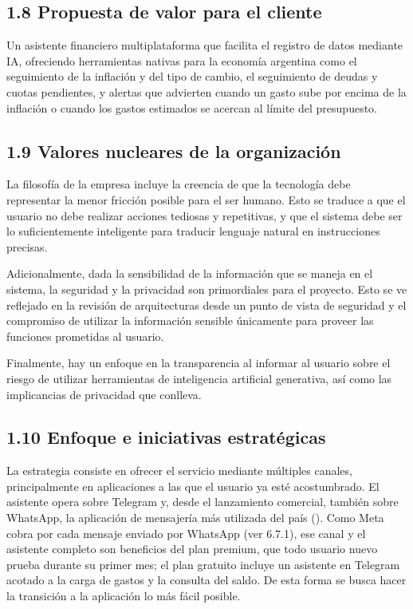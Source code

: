 \subsection*{1.8 Propuesta de valor para el
cliente}\label{propuesta-de-valor-para-el-cliente}

Un asistente financiero multiplataforma que facilita el registro de
datos mediante IA, ofreciendo herramientas nativas para la economía
argentina como el seguimiento de la inflación y del tipo de cambio, el
seguimiento de deudas y cuotas pendientes, y alertas que advierten
cuando un gasto sube por encima de la inflación o cuando los gastos
estimados se acercan al límite del presupuesto.

\subsection*{1.9 Valores nucleares de la
organización}\label{valores-nucleares-de-la-organizaciuxf3n}

La filosofía de la empresa incluye la creencia de que la tecnología debe
representar la menor fricción posible para el ser humano. Esto se
traduce a que el usuario no debe realizar acciones tediosas y
repetitivas, y que el sistema debe ser lo suficientemente inteligente
para traducir lenguaje natural en instrucciones precisas.

Adicionalmente, dada la sensibilidad de la información que se maneja en
el sistema, la seguridad y la privacidad son primordiales para el
proyecto. Esto se ve reflejado en la revisión de arquitecturas desde un
punto de vista de seguridad y el compromiso de utilizar la información
sensible únicamente para proveer las funciones prometidas al usuario.

Finalmente, hay un enfoque en la transparencia al informar al usuario
sobre el riesgo de utilizar herramientas de inteligencia artificial
generativa, así como las implicancias de privacidad que conlleva.

\subsection*{1.10 Enfoque e iniciativas
estratégicas}\label{enfoque-e-iniciativas-estratuxe9gicas}

La estrategia consiste en ofrecer el servicio mediante múltiples
canales, principalmente en aplicaciones a las que el usuario ya esté
acostumbrado. El asistente opera sobre Telegram y, desde el lanzamiento
comercial, también sobre WhatsApp, la aplicación de mensajería más
utilizada del país ().
Como Meta cobra por cada mensaje enviado por WhatsApp (ver 6.7.1), ese
canal y el asistente completo son beneficios del plan premium, que todo
usuario nuevo prueba durante su primer mes; el plan gratuito incluye un
asistente en Telegram acotado a la carga de gastos y la consulta del
saldo. De esta forma se busca hacer la transición a la aplicación lo más
fácil posible.

